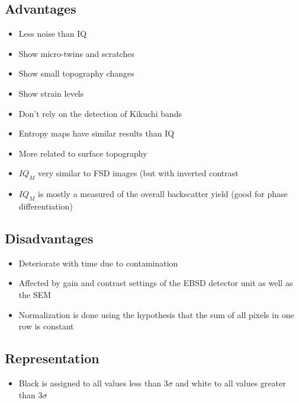 \documentclass[letterpaper]{article}
\begin{document}
		\subsection{Advantages}
			\begin{itemize}
				\item Less noise than IQ \cite{Tao2005}
				\item Show micro-twins and scratches \cite{Tao2005}
				\item Show small topography changes \cite{Tao2005}
				\item Show strain levels \cite{Tao2005}
				\item Don't rely on the detection of Kikuchi bands \cite{Tao2005}
				\item Entropy maps have similar results than IQ \cite{Tao2005}
				\item More related to surface topography \cite{Wright2006}
				\item $IQ_M$ very similar to FSD images (but with inverted contrast \cite{Wright2006}
				\item $IQ_M$ is mostly a measured of the overall backscatter yield (good for phase differentiation) \cite{Wright2006}
			\end{itemize}
		
		\subsection{Disadvantages}
			\begin{itemize}
				\item Deteriorate with time due to contamination \cite{Tao2005}
				\item Affected by gain and contrast settings of the EBSD detector unit as well as the SEM \cite{Wright2006}
				\item Normalization is done using the hypothesis that the sum of all pixels in one row is constant \cite{Tao2005}
			\end{itemize}
		
		\subsection{Representation}
			\begin{itemize}
				\item Black is assigned to all values less than $3\sigma$ and white to all values greater than $3\sigma$ \cite{Wright2006}
			\end{itemize}

\newpage
\end{document}
